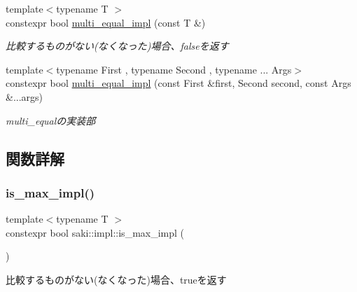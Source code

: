 \begin{DoxyCompactItemize}
{\footnotesize template$<$typename T $>$ }\\constexpr bool \mbox{\hyperlink{namespacesaki_1_1impl_ac271639854025a923addee4879780f96}{multi\+\_\+equal\+\_\+impl}} (const T \&)
\begin{DoxyCompactList}\small\item\em 比較するものがない(なくなった)場合、falseを返す \end{DoxyCompactList}\item 
{\footnotesize template$<$typename First , typename Second , typename ... Args$>$ }\\constexpr bool \mbox{\hyperlink{namespacesaki_1_1impl_a45c9f8730634f6b621bca7d8dc73e43d}{multi\+\_\+equal\+\_\+impl}} (const First \&first, Second second, const Args \&...args)
\begin{DoxyCompactList}\small\item\em multi\+\_\+equalの実装部 \end{DoxyCompactList}\end{DoxyCompactItemize}


\subsection{関数詳解}
\mbox{\label{namespacesaki_1_1impl_a1eb562842d6a5bcde39a463f04755157}} 
\subsubsection{\texorpdfstring{is\+\_\+max\+\_\+impl()}{is\_max\_impl()}\hspace{0.1cm}{\footnotesize\ttfamily [1/2]}}
{\footnotesize\ttfamily template$<$typename T $>$ \\
constexpr bool saki\+::impl\+::is\+\_\+max\+\_\+impl (\begin{DoxyParamCaption}\item[{const T \&}]{ }\end{DoxyParamCaption})}



比較するものがない(なくなった)場合、trueを返す 

\mbox{\label{namespacesaki_1_1impl_ad5f6398b5affbb107eb4e49c35e36e6a}} 
